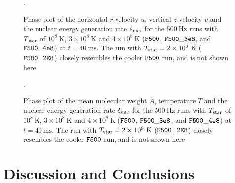 \documentclass[preprint,times,tighten]{aastex63}
\begin{document}
\begin{figure}[t]
    \centering
    \caption{\label{fig:uv_hot}Phase plot of the horizontal $r$-velocity $u$, vertical $z$-velocity $v$ and the nuclear energy generation rate $\dot{e}_{\rm nuc}$ for the $500~\mathrm{Hz}$ runs with $T_{\rm star}$ of $10^8~\mathrm{K}$, $3\times10^8~\mathrm{K}$ and $4\times10^8~\mathrm{K}$ ($\tt{F500}$, $\tt{F500\_3e8}$, and $\tt{F500\_4e8}$) at $t = 40~\mathrm{ms}$. The run with $T_{\rm star} = 2\times10^8~\mathrm{K}$ ($\tt{F500\_2E8}$) closely resembles the cooler $\tt{F500}$ run, and is not shown here}.
\end{figure}

\begin{figure}[t]
    \centering
    \caption{\label{fig:abar_hot}Phase plot of the mean molecular weight $\bar{A}$, temperature $T$ and the nuclear energy generation rate $\dot{e}_{\rm nuc}$ for the $500~\mathrm{Hz}$ runs with $T_{\rm star}$ of $10^8~\mathrm{K}$, $3\times10^8~\mathrm{K}$ and $4\times10^8~\mathrm{K}$ ($\tt{F500}$, $\tt{F500\_3e8}$, and $\tt{F500\_4e8}$) at $t = 40~\mathrm{ms}$. The run with $T_{\rm star} = 2\times10^8~\mathrm{K}$ ($\tt{F500\_2E8}$) closely resembles the cooler $\tt{F500}$ run, and is not shown here}.
\end{figure}

\section{Discussion and Conclusions}\label{Sec:conclusions}
\end{document}
